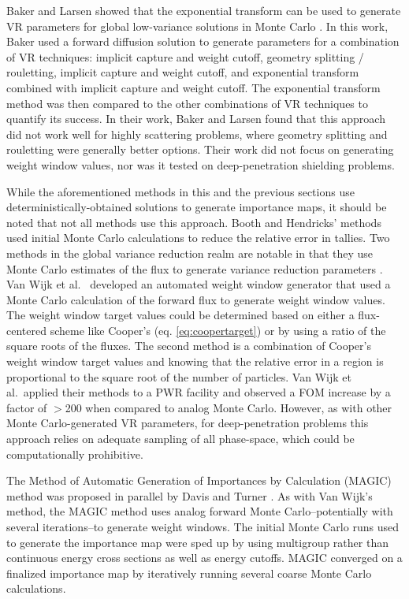 Baker and Larsen showed that the exponential transform can be used to generate
VR parameters for global low-variance solutions in Monte Carlo
\cite{baker_localexponential_1993}. In this work, Baker used a forward diffusion
solution to generate parameters for a combination of VR techniques: implicit
capture and weight cutoff, geometry splitting / rouletting, implicit
capture and weight cutoff, and exponential transform combined with
implicit capture and weight cutoff. The exponential transform method was then
compared to the other combinations of VR techniques to quantify its success.
In their work, Baker and Larsen found that
this approach 
did not work well for highly scattering problems, where geometry
splitting and rouletting were generally better options. Their work did not
focus on generating weight window values, nor was it tested on deep-penetration
shielding problems.

While the aforementioned methods in this and the previous sections use
deterministically-obtained solutions to generate importance maps, it should be
noted that not all methods use this approach. Booth and Hendricks' methods used
initial Monte Carlo calculations to reduce the relative error in tallies. Two
methods in the global variance reduction realm are notable in that they use
Monte Carlo estimates of the flux to generate variance reduction parameters
\cite{van_wijk_easy_2011, davis_comparison_2011}.
Van Wijk et al.\ \cite{van_wijk_easy_2011} developed an automated weight
window generator that used a Monte
Carlo calculation of the forward flux to generate weight window values. The
weight window target values could be determined based on either a flux-centered
scheme like Cooper's (eq. \eqref{eq:coopertarget})
or by using a ratio of the square roots of the fluxes. 
The
second method is a combination of Cooper's weight window target values and
knowing that the relative error in a region
is proportional to the square root of the number
of particles.
Van Wijk et al.\ applied their methods to a PWR facility and observed a FOM
increase by a factor of $>$200 when compared to analog Monte Carlo. However, as
with other Monte Carlo-generated VR parameters, for deep-penetration problems
this approach relies on adequate sampling of all phase-space, which could be
computationally prohibitive.

The Method of Automatic Generation of Importances by Calculation (MAGIC) method
was proposed in parallel by Davis and Turner \cite{davis_comparison_2011}.
As with Van Wijk's method, the MAGIC method uses analog forward Monte Carlo--potentially with several iterations--to generate weight windows. The initial
Monte Carlo runs used to generate the importance map were sped up by
using multigroup rather than continuous energy cross sections as well as energy cutoffs. MAGIC
converged on a finalized importance map by iteratively running several coarse
Monte Carlo calculations.

